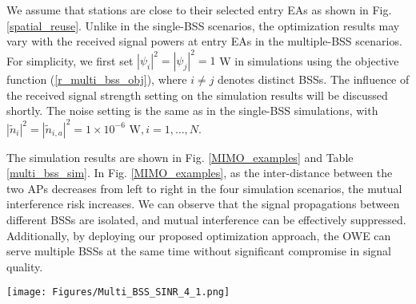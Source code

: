 We assume that stations are close to their selected entry EAs as shown in Fig. \ref{spatial_reuse}. Unlike in the single-BSS scenarios, the optimization results may vary with the received signal powers at entry EAs in the multiple-BSS scenarios. For simplicity, we first set $|\psi_i|^2 = |\psi_j|^2 = 1$ W in simulations using the objective function (\ref{r_multi_bss_obj}), where $i \neq j$ denotes distinct BSSs. The influence of the received signal strength setting on the simulation results will be discussed shortly. The noise setting is the same as in the single-BSS simulations, with $|\widetilde{n}_i|^2=|\widetilde{n}_{i,a}|^2=1\times 10^{-6} \text{ W}, i=1,\dots, N$.
\par
The simulation results are shown in Fig. \ref{MIMO_examples} and Table \ref{multi_bss_sim}. In Fig. \ref{MIMO_examples},  as the inter-distance between the two APs decreases from left to right in the four simulation scenarios, the mutual interference risk increases.
We can observe that the signal propagations between different BSSs are isolated, and mutual interference can be effectively suppressed. Additionally, by deploying our proposed optimization approach, the OWE can serve multiple BSSs at the same time without significant compromise in signal quality.

\begin{figure*}[htbp]
\centering
\texttt{[image: Figures/Multi\_BSS\_SINR\_4\_1.png]}
\caption{OWE Multiple-BSSs application optimization results. Two data streams propagate from two Entry EAs through the OWE to two APs marked as AP1 and AP2 simultaneously.}
\label{MIMO_examples}
\vspace{-0.2cm}
\end{figure*}

